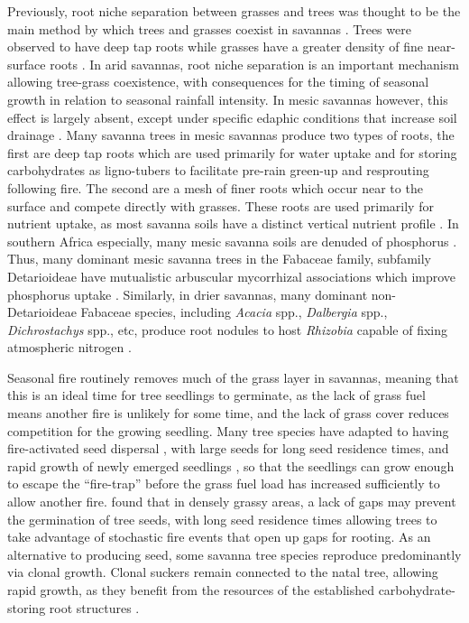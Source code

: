 \begin{refsection}
Previously, root niche separation between grasses and trees was thought to be the main method by which trees and grasses coexist in savannas \citep{Walter1971}. Trees were observed to have deep tap roots while grasses have a greater density of fine near-surface roots \citep{Timberlake1993}. In arid savannas, root niche separation is an important mechanism allowing tree-grass coexistence, with consequences for the timing of seasonal growth in relation to seasonal rainfall intensity. In mesic savannas however, this effect is largely absent, except under specific edaphic conditions that increase soil drainage \citep{Case2020, Ketter2018, Sankaran2004, Higgins2000}. Many savanna trees in mesic savannas produce two types of roots, the first are deep tap roots which are used primarily for water uptake and for storing carbohydrates as ligno-tubers to facilitate pre-rain green-up and resprouting following fire. The second are a mesh of finer roots which occur near to the surface and compete directly with grasses. These roots are used primarily for nutrient uptake, as most savanna soils have a distinct vertical nutrient profile \citep{Tomlinson2012, February2013}. In southern Africa especially, many mesic savanna soils are denuded of phosphorus \citep{Campbell1996}. Thus, many dominant mesic savanna trees in the Fabaceae family, subfamily Detarioideae have mutualistic arbuscular mycorrhizal associations which improve phosphorus uptake \citep{Gomes2021}. Similarly, in drier savannas, many dominant non-Detarioideae Fabaceae species, including \textit{Acacia} spp., \textit{Dalbergia} spp., \textit{Dichrostachys} spp., etc, produce root nodules to host \textit{Rhizobia} capable of fixing atmospheric nitrogen \citep{Hogberg1986}.

Seasonal fire routinely removes much of the grass layer in savannas, meaning that this is an ideal time for tree seedlings to germinate, as the lack of grass fuel means another fire is unlikely for some time, and the lack of grass cover reduces competition for the growing seedling. Many tree species have adapted to having fire-activated seed dispersal \citep{Veldman2015}, with large seeds for long seed residence times, and rapid growth of newly emerged seedlings \citep{Daibes2019}, so that the seedlings can grow enough to escape the ``fire-trap'' before the grass fuel load has increased sufficiently to allow another fire. \citet{Wakeling2015} found that in densely grassy areas, a lack of gaps may prevent the germination of tree seeds, with long seed residence times allowing trees to take advantage of stochastic fire events that open up gaps for rooting. As an alternative to producing seed, some savanna tree species reproduce predominantly via clonal growth. Clonal suckers remain connected to the natal tree, allowing rapid growth, as they benefit from the resources of the established carbohydrate-storing root structures \citep{Bond2003}.


\end{refsection}
